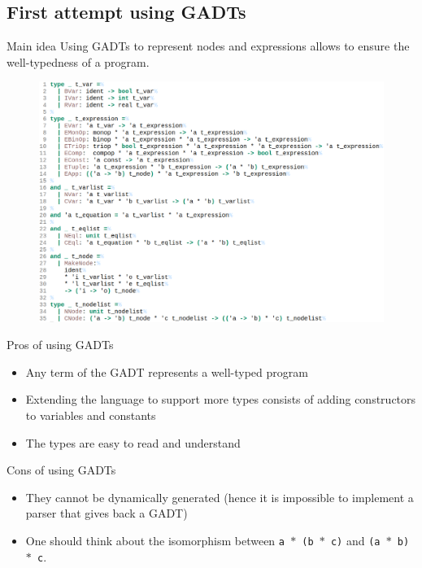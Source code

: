 \documentclass{beamer}
\begin{document}
\subsection{First attempt using GADTs}
\begin{frame}
	\begin{block}{Main idea}
		Using GADTs to represent nodes and expressions allows to ensure the
		well-typedness of a program.
	\end{block}
	\begin{figure}
		\centering
		\includegraphics[width=.75\textwidth]{imgs/gadt.png}
	\end{figure}
\end{frame}
\begin{frame}
	\begin{block}{Pros of using GADTs}
		\begin{itemize}
			\item Any term of the GADT represents a well-typed program
			\item Extending the language to support more types consists of adding
				constructors to variables and constants
			\item The types are easy to read and understand
		\end{itemize}
	\end {block}

	\begin{block}{Cons of using GADTs}
		\begin{itemize}
			\item
			They cannot be dynamically generated (hence it is impossible to
			implement a parser that gives back a GADT)
			\item
			One should think about the isomorphism between
			\texttt{a $\ast$ (b $\ast$ c)} and \texttt{(a $\ast$ b) $\ast$ c}.
		\end{itemize}
	\end{block}
\end{frame}
\end{document}
